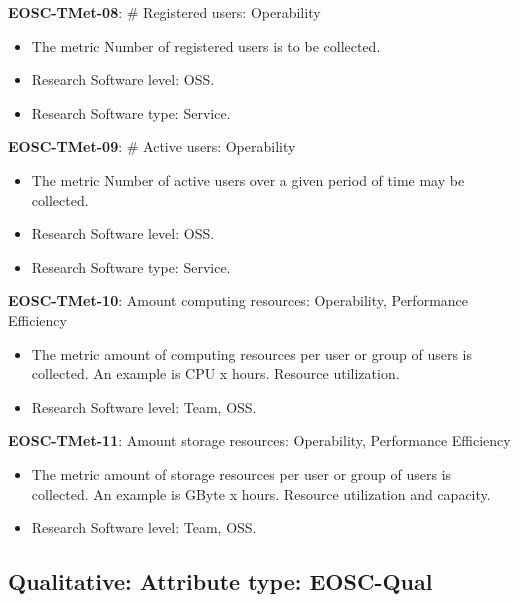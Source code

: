 \textbf{EOSC-TMet-08}: \# Registered users: Operability

\begin{itemize}
    \item The metric Number of registered users is to be collected. \cite{orviz_fernandez_eosc-synergy_2020}
    \item Research Software level: OSS.
    \item Research Software type: Service.
\end{itemize}

\textbf{EOSC-TMet-09}: \# Active users: Operability

\begin{itemize}
    \item The metric Number of active users over a given period of time may be collected. \cite{orviz_fernandez_eosc-synergy_2020}
    \item Research Software level: OSS.
    \item Research Software type: Service.
\end{itemize}

\textbf{EOSC-TMet-10}: Amount computing resources: Operability, Performance Efficiency

\begin{itemize}
    \item The metric amount of computing resources per user or group of users is collected. An example is CPU x hours. Resource utilization. \cite{iso_25010_2011_2017,orviz_fernandez_eosc-synergy_2020}
    \item Research Software level: Team, OSS.
\end{itemize}

\textbf{EOSC-TMet-11}: Amount storage resources: Operability, Performance Efficiency

\begin{itemize}
    \item The metric amount of storage resources per user or group of users is collected. An example is GByte x hours. Resource utilization and capacity. \cite{iso_25010_2011_2017,orviz_fernandez_eosc-synergy_2020}
    \item Research Software level: Team, OSS.
\end{itemize}

\subsection{Qualitative: Attribute type: EOSC-Qual}

